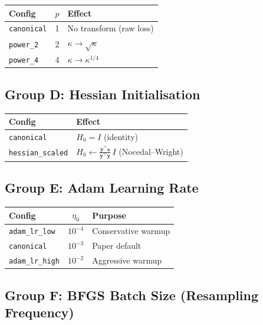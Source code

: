 \documentclass[11pt,a4paper]{article}
\begin{document}
\begin{center}
\begin{tabular}{@{}lcp{5cm}@{}}
\toprule
\textbf{Config} & $p$ & \textbf{Effect} \\
\midrule
\texttt{canonical} & 1 & No transform (raw loss) \\
\texttt{power\_2}  & 2 & $\kappa \to \sqrt{\kappa}$ \\
\texttt{power\_4}  & 4 & $\kappa \to \kappa^{1/4}$ \\
\bottomrule
\end{tabular}
\end{center}

\subsection{Group D: Hessian Initialisation}

\begin{center}
\begin{tabular}{@{}lp{8cm}@{}}
\toprule
\textbf{Config} & \textbf{Effect} \\
\midrule
\texttt{canonical}       & $H_0 = I$ (identity) \\
\texttt{hessian\_scaled} & $H_0 \leftarrow \frac{\bm{y}^\top\bm{s}}{\bm{y}^\top\bm{y}}\,I$ (Nocedal--Wright) \\
\bottomrule
\end{tabular}
\end{center}

\subsection{Group E: Adam Learning Rate}

\begin{center}
\begin{tabular}{@{}lcp{5cm}@{}}
\toprule
\textbf{Config} & $\eta_0$ & \textbf{Purpose} \\
\midrule
\texttt{adam\_lr\_low}  & $10^{-4}$ & Conservative warmup \\
\texttt{canonical}       & $10^{-3}$ & Paper default \\
\texttt{adam\_lr\_high} & $10^{-2}$ & Aggressive warmup \\
\bottomrule
\end{tabular}
\end{center}

\subsection{Group F: BFGS Batch Size (Resampling Frequency)}
\end{document}
